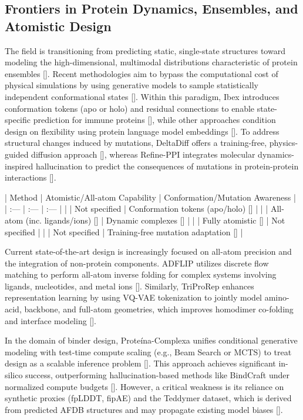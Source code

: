 \documentclass[11pt]{article}
\begin{document}
\subsection{Frontiers in Protein Dynamics, Ensembles, and Atomistic Design}

The field is transitioning from predicting static, single-state structures toward modeling the high-dimensional, multimodal distributions characteristic of protein ensembles [\citep{2509.17224}]. Recent methodologies aim to bypass the computational cost of physical simulations by using generative models to sample statistically independent conformational states [\citep{2509.17224}]. Within this paradigm, Ibex introduces conformation tokens (apo or holo) and residual connections to enable state-specific prediction for immune proteins [\citep{2507.09054}], while other approaches condition design on flexibility using protein language model embeddings [\citep{2508.18211}]. To address structural changes induced by mutations, DeltaDiff offers a training-free, physics-guided diffusion approach [\citep{2606.04452}], whereas Refine-PPI integrates molecular dynamics-inspired hallucination to predict the consequences of mutations in protein-protein interactions [\citep{2601.06214}].

| Method | Atomistic/All-atom Capability | Conformation/Mutation Awareness |
| :--- | :--- | :--- |
| \citep{2507.09054} | Not specified | Conformation tokens (apo/holo) [\citep{2507.09054}] |
| \citep{2507.14156} | All-atom (inc. ligands/ions) [\citep{2507.14156}] | Dynamic complexes [\citep{2507.14156}] |
| \citep{2603.27950} | Fully atomistic [\citep{2603.27950}] | Not specified |
| \citep{2606.04452} | Not specified | Training-free mutation adaptation [\citep{2606.04452}] |

Current state-of-the-art design is increasingly focused on all-atom precision and the integration of non-protein components. ADFLIP utilizes discrete flow matching to perform all-atom inverse folding for complex systems involving ligands, nucleotides, and metal ions [\citep{2507.14156}]. Similarly, TriProRep enhances representation learning by using VQ-VAE tokenization to jointly model amino-acid, backbone, and full-atom geometries, which improves homodimer co-folding and interface modeling [\citep{2605.22133}].

In the domain of binder design, Proteína-Complexa unifies conditional generative modeling with test-time compute scaling (e.g., Beam Search or MCTS) to treat design as a scalable inference problem [\citep{2603.27950}]. This approach achieves significant in-silico success, outperforming hallucination-based methods like BindCraft under normalized compute budgets [\citep{2603.27950}]. However, a critical weakness is its reliance on synthetic proxies (fpLDDT, fipAE) and the Teddymer dataset, which is derived from predicted AFDB structures and may propagate existing model biases [\citep{2603.27950}].
\end{document}
